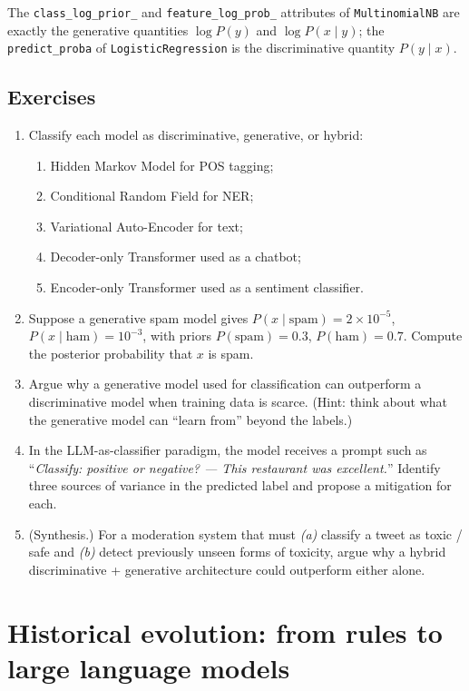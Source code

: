 \documentclass[12pt,a4paper]{report}
\theoremstyle{definition}
\theoremstyle{remark}
\begin{document}
The \texttt{class\_log\_prior\_} and \texttt{feature\_log\_prob\_} attributes of \texttt{MultinomialNB} are exactly the generative quantities $\log P(y)$ and $\log P(x \mid y)$; the \texttt{predict\_proba} of \texttt{LogisticRegression} is the discriminative quantity $P(y \mid x)$.

\subsection{Exercises}
\begin{enumerate}
    \item Classify each model as discriminative, generative, or hybrid:
    \begin{enumerate}
        \item Hidden Markov Model for POS tagging;
        \item Conditional Random Field for NER;
        \item Variational Auto-Encoder for text;
        \item Decoder-only Transformer used as a chatbot;
        \item Encoder-only Transformer used as a sentiment classifier.
    \end{enumerate}
    \item Suppose a generative spam model gives $P(x \mid \text{spam}) = 2 \times 10^{-5}$, $P(x \mid \text{ham}) = 10^{-3}$, with priors $P(\text{spam}) = 0.3$, $P(\text{ham}) = 0.7$. Compute the posterior probability that $x$ is spam.
    \item Argue why a generative model used for classification can outperform a discriminative model when training data is scarce. (Hint: think about what the generative model can ``learn from'' beyond the labels.)
    \item In the LLM-as-classifier paradigm, the model receives a prompt such as ``\emph{Classify: positive or negative? --- This restaurant was excellent.}'' Identify three sources of variance in the predicted label and propose a mitigation for each.
    \item (Synthesis.) For a moderation system that must \emph{(a)} classify a tweet as toxic / safe and \emph{(b)} detect previously unseen forms of toxicity, argue why a hybrid discriminative + generative architecture could outperform either alone.
\end{enumerate}

\section{Historical evolution: from rules to large language models}
\label{sec:history}
\end{document}
